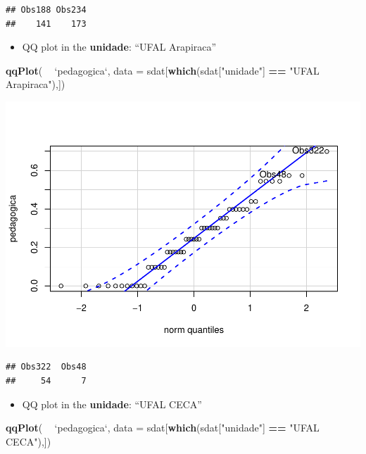 \documentclass[]{article}
\newenvironment{Shaded}{\begin{snugshade}}{\end{snugshade}}
\newcommand{\DataTypeTok}[1]{\textcolor[rgb]{0.13,0.29,0.53}{#1}}
\newcommand{\KeywordTok}[1]{\textcolor[rgb]{0.13,0.29,0.53}{\textbf{#1}}}
\newcommand{\NormalTok}[1]{#1}
\newcommand{\OperatorTok}[1]{\textcolor[rgb]{0.81,0.36,0.00}{\textbf{#1}}}
\newcommand{\StringTok}[1]{\textcolor[rgb]{0.31,0.60,0.02}{#1}}
\providecommand{\tightlist}{%
  \setlength{\itemsep}{0pt}\setlength{\parskip}{0pt}}
\begin{document}
\begin{verbatim}
## Obs188 Obs234 
##    141    173
\end{verbatim}

\begin{itemize}
\tightlist
\item
  QQ plot in the \textbf{unidade}: ``UFAL Arapiraca''
\end{itemize}

\begin{Shaded}
\begin{Highlighting}[]
\KeywordTok{qqPlot}\NormalTok{( }\OperatorTok{~}\StringTok{ `}\DataTypeTok{pedagogica}\StringTok{`}\NormalTok{, }\DataTypeTok{data =}\NormalTok{ sdat[}\KeywordTok{which}\NormalTok{(sdat[}\StringTok{"unidade"}\NormalTok{] }\OperatorTok{==}\StringTok{ "UFAL Arapiraca"}\NormalTok{),])}
\end{Highlighting}
\end{Shaded}

\includegraphics{factorialAnova_files/figure-latex/unnamed-chunk-21-1.pdf}

\begin{verbatim}
## Obs322  Obs48 
##     54      7
\end{verbatim}

\begin{itemize}
\tightlist
\item
  QQ plot in the \textbf{unidade}: ``UFAL CECA''
\end{itemize}

\begin{Shaded}
\begin{Highlighting}[]
\KeywordTok{qqPlot}\NormalTok{( }\OperatorTok{~}\StringTok{ `}\DataTypeTok{pedagogica}\StringTok{`}\NormalTok{, }\DataTypeTok{data =}\NormalTok{ sdat[}\KeywordTok{which}\NormalTok{(sdat[}\StringTok{"unidade"}\NormalTok{] }\OperatorTok{==}\StringTok{ "UFAL CECA"}\NormalTok{),])}
\end{Highlighting}
\end{Shaded}
\end{document}
